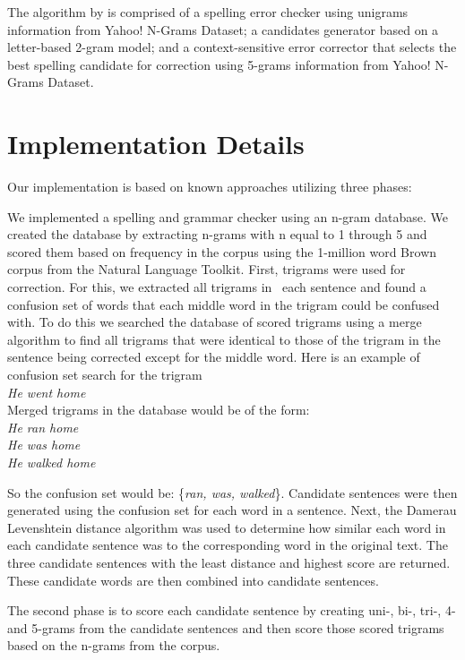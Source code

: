 \documentclass[twocolumn]{article}
\newcommand{\tab}{\hspace*{2em}}
\begin{document}
The algorithm by \cite{Bassil12} is comprised of a spelling error checker using unigrams information from Yahoo! N-Grams Dataset; a candidates generator based on a letter-based 2-gram model; and a context-sensitive error corrector that selects the best spelling candidate for correction using 5-grams information from Yahoo! N-Grams Dataset.

\section{Implementation Details}
Our implementation is based on known approaches utilizing three phases:

We implemented a spelling and grammar checker using an n-gram database. We created the database by extracting n-grams with n equal to 1 through 5 and scored them based on frequency in the corpus using the 1-million word Brown corpus from the Natural Language Toolkit.
First, trigrams were used for correction. For this, we extracted all trigrams in  each sentence and found a confusion set of words that each middle word in the trigram could be confused with. To do this we searched the database of scored trigrams using a merge algorithm to find all trigrams that were identical to those of the trigram in the sentence being corrected except for the middle word. Here is an example of confusion set search for the trigram
\\
\newline
\tab\tab\emph{He went home}
\\\newline
Merged trigrams in the database would be of the form:
\\\newline
\tab\tab\emph{He ran home} \\
\tab\tab\emph{He was home} \\
\tab\tab\emph{He walked home}
\newline

So the confusion set would be: \{\emph{ran, was, walked}\}. Candidate sentences were then generated using the confusion set for each word in a sentence. Next, the Damerau Levenshtein distance \cite{damerau64,levenshtein66} algorithm was used to determine how similar each word in each candidate sentence was to the corresponding word in the original text. The three candidate sentences with the least distance and highest score are returned. These candidate words are then combined into candidate sentences.

The second phase is to score each candidate sentence by creating uni-, bi-, tri-, 4- and 5-grams from the candidate sentences and then score those scored trigrams based on the n-grams from the corpus.
\end{document}
